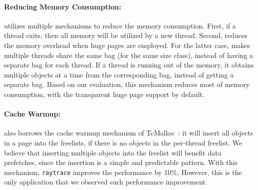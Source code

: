 \paragraph{Reducing Memory Consumption:} \NM{} utilizes multiple mechanisms to reduce the memory consumption. First, if a thread exits, then all memory will be utilized by a new thread. Second, \NM{} reduces the memory overhead when huge pages are employed.  For the latter case, \NM{} makes multiple threads share the same bag (for the same size class), instead of having a separate bag for each thread. If a thread is running out of the memory, it obtains multiple objects at a time from the corresponding bag, instead of getting a separate bag. Based on our evaluation, this mechanism reduces most of memory consumption, with the transparent huge page support by default.  




\paragraph{Cache Warmup:} \NM{} also borrows the cache warmup mechanism of TcMalloc~\cite{tcmalloc}: it will insert all objects in a page into the freelists, if there is no objects in the per-thread freelist. We believe that inserting multiple objects into the freelist will benefit data prefetches, since the insertion is a simple and predictable pattern. With this mechanism, \texttt{raytrace} improves the performance by 10\%. However, this is the only application that we observed such performance improvement. 

